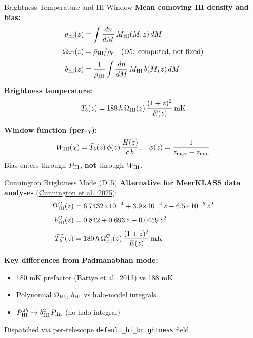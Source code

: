 \begin{frame}{Brightness Temperature and HI Window}
\textbf{Mean comoving HI density and bias:}
\begin{align}
\bar\rho_{\mathrm{HI}}(z) &= \int \frac{dn}{dM}\,M_{\mathrm{HI}}(M,z)\,dM \\[3pt]
\Omega_{\mathrm{HI}}(z) &= \bar\rho_{\mathrm{HI}} / \rho_{\mathrm{c}} \quad \text{(D5: computed, not fixed)} \\[3pt]
b_{\mathrm{HI}}(z) &= \frac{1}{\bar\rho_{\mathrm{HI}}}\int \frac{dn}{dM}\,M_{\mathrm{HI}}\,b(M,z)\,dM
\end{align}

\textbf{Brightness temperature:}
\begin{equation}
\bar{T}_b(z) = 188\,h\,\Omega_{\mathrm{HI}}(z)\,\frac{(1+z)^2}{E(z)} \,\mathrm{mK}
\end{equation}

\textbf{Window function (per-$\chi$):}
\begin{equation}
W_{\mathrm{HI}}(\chi) = \bar{T}_b(z)\,\phi(z)\,\frac{H(z)}{c\,h}, \quad \phi(z) = \frac{1}{z_{\max}-z_{\min}}
\end{equation}
Bias enters through $P_{\mathrm{HI}}$, \textbf{not} through $W_{\mathrm{HI}}$.
\end{frame}

\begin{frame}{Cunnington Brightness Mode (D15)}
\textbf{Alternative for MeerKLASS data analyses} (\href{https://arxiv.org/abs/2510.27549}{Cunnington et al.\ 2025}):
\begin{align}
\Omega_{\mathrm{HI}}^{\mathrm{C}}(z) &= 6.7432{\times}10^{-4} + 3.9{\times}10^{-4}\,z - 6.5{\times}10^{-5}\,z^2 \\[3pt]
b_{\mathrm{HI}}^{\mathrm{C}}(z) &= 0.842 + 0.693\,z - 0.0459\,z^2 \\[3pt]
\bar{T}_b^{\mathrm{C}}(z) &= 180\,h\,\Omega_{\mathrm{HI}}^{\mathrm{C}}(z)\,\frac{(1+z)^2}{E(z)} \,\mathrm{mK}
\end{align}

\textbf{Key differences from Padmanabhan mode:}
\begin{itemize}
    \item 180 mK prefactor (\href{https://arxiv.org/abs/1209.0646}{Battye et al.\ 2013}) vs 188 mK
    \item Polynomial $\Omega_{\mathrm{HI}}$, $b_{\mathrm{HI}}$ vs halo-model integrals
    \item $P_{\mathrm{HI}}^{2h} \to b_{\mathrm{HI}}^2\,P_{\mathrm{lin}}$ (no halo integral)
\end{itemize}

Dispatched via per-telescope \texttt{default\_hi\_brightness} field.
\end{frame}
